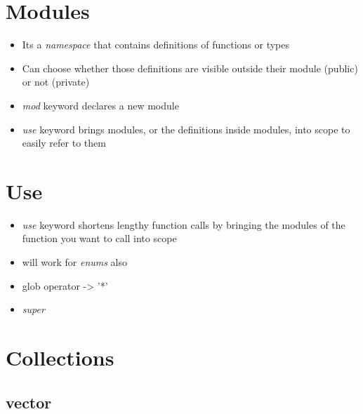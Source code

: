 \documentclass[11pt]{article}
\begin{document}
\section{Modules}
\label{sec-11}

\begin{itemize}
\item Its a \emph{namespace} that contains definitions of functions or types

\item Can choose whether those definitions are visible outside their module (public) or not (private)

\item \emph{mod} keyword declares a new module

\item \emph{use} keyword brings modules, or the definitions inside modules, into scope to easily refer to them
\end{itemize}


\section{Use}
\label{sec-12}

\begin{itemize}
\item \emph{use} keyword shortens lengthy function calls by bringing the modules of the function you want to call into scope

\item will work for \emph{enums} also

\item glob operator -> '*'

\item \emph{super}
\end{itemize}


\section{Collections}
\label{sec-13}

\subsection{vector}
\label{sec-13-1}
\end{document}
